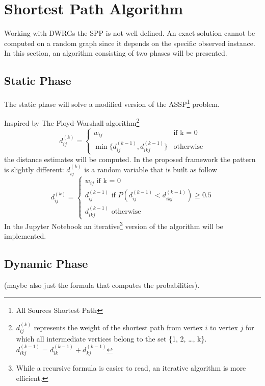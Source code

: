 \section{Shortest Path Algorithm}\label{ssp}

Working with DWRGs the SPP is not well defined.
An exact solution cannot be computed on a random graph since it depends on the specific observed instance.
In this section, an algorithm consisting of two phases will be presented.

\subsection{Static Phase}

The static phase will solve a modified version of the ASSP\footnote{All Sources Shortest Path} problem.

Inspired by The Floyd-Warshall\cite{cormen2010introduction} algorithm\footnote{$d_{ij}^{(k)}$ represents the weight of the shortest path from vertex $i$ to vertex $j$ for which all intermediate vertices belong to the set \{1, 2, \dots, k\}. $d_{ikj}^{(k-1)} = d_{ik}^{(k-1)} + d_{kj}^{(k-1)}$}
\begin{equation*}
	d_{ij}^{(k)} = 
	\begin{cases}
		w_{ij} & \text{if k = 0} \\
		\min\{d_{ij}^{(k-1)}, d_{ikj}^{(k-1)}\} & \text{otherwise}
	\end{cases}
\end{equation*}
the distance estimates will be computed.
In the proposed framework the pattern is slightly different: $d_{ij}^{(k)}$ is a random variable that is built as follow
\begin{equation*}
	d_{ij}^{(k)} = 
	\begin{cases}
		w_{ij} \text{ \ \ \ if k = 0} \\
		d_{ij}^{(k-1)} \text{ if } P(d_{ij}^{(k-1)} < d_{ikj}^{(k-1)}) \geq 0.5 \\
		d_{ikj}^{(k-1)} \text{ otherwise}
	\end{cases}
\end{equation*}
In the Jupyter Notebook an iterative\footnote{While a recursive formula is easier to read, an iterative algorithm is more efficient.} version of the algorithm will be implemented.
\subsection{Dynamic Phase}
(maybe also just the formula that computes the probabilities).

